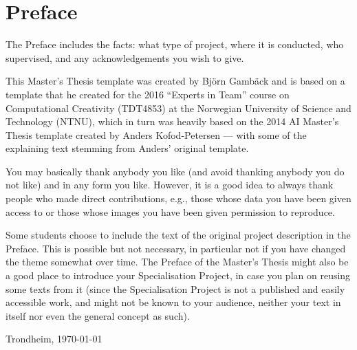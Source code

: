 \section*{Preface}

The Preface includes the facts: what type of project, where it is conducted, 
who supervised, and any acknowledgements you wish to give. 

This Master's Thesis template was created by Bj\"orn Gamb\"ack and is based on a template that he created for the 2016 ``Experts in Team'' course on 
Computational Creativity (TDT4853) at the Norwegian University of Science and Technology (NTNU),
which in turn was heavily based on the 2014 AI Master's Thesis template created by Anders Kofod-Petersen ---
with some of the explaining text stemming from Anders' original template.

You may basically thank anybody you like (and avoid thanking anybody you do not like) and in any form you like.
However, it is a good idea to always thank people who made direct contributions, e.g., those whose data you have been given access to or those whose images you have been given permission to reproduce.

Some students choose to include the text of the original project description in the Preface. This is possible but not necessary,
in particular not if you have changed the theme somewhat over time.
The Preface of the Master's Thesis might also be a good place to introduce your Specialisation Project, in case you plan
on reusing some texts from it (since the Specialisation Project is not a published and easily accessible work, and might
not be known to your audience, neither your text in itself nor even the general concept as such).

\vfill

\hfill \thesisAuthor

\hfill Trondheim, \today
